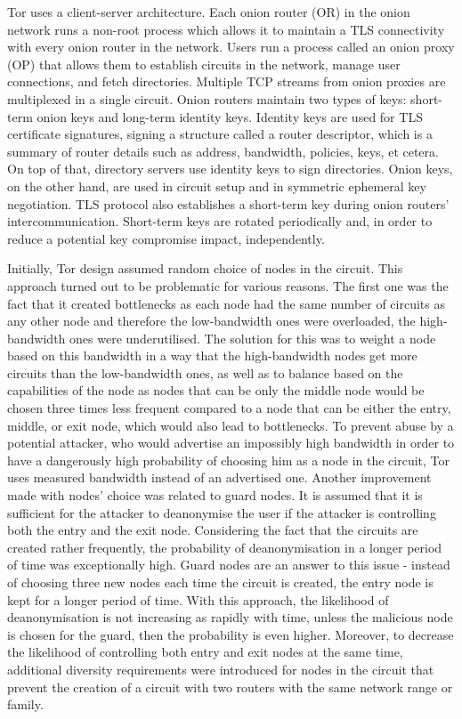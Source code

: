 Tor uses a client-server architecture. Each onion router (OR) in the onion network runs a non-root process which allows it to maintain a TLS connectivity with every onion router in the network. Users run a process called an onion proxy (OP) that allows them to establish circuits in the network, manage user connections, and fetch directories. Multiple TCP streams from onion proxies are multiplexed in a single circuit. Onion routers maintain two types of keys: short-term onion keys and long-term identity keys. Identity keys are used for TLS certificate signatures, signing a structure called a router descriptor, which is a summary of router details such as address, bandwidth, policies, keys, et cetera. On top of that, directory servers use identity keys to sign directories. Onion keys, on the other hand, are used in circuit setup and in symmetric ephemeral key negotiation. TLS protocol also establishes a short-term key during onion routers’ intercommunication. Short-term keys are rotated periodically and, in order to reduce a potential key compromise impact, independently. 

Initially, Tor design assumed random choice of nodes in the circuit. This approach turned out to be problematic for various reasons. The first one was the fact that it created bottlenecks as each node had the same number of circuits as any other node and therefore the low-bandwidth ones were overloaded, the high-bandwidth ones were underutilised. The solution for this was to weight a node based on this bandwidth in a way that the high-bandwidth nodes get more circuits than the low-bandwidth ones, as well as to balance based on the capabilities of the node as nodes that can be only the middle node would be chosen three times less frequent compared to a node that can be either the entry, middle, or exit node, which would also lead to bottlenecks. To prevent abuse by a potential attacker, who would advertise an impossibly high bandwidth in order to have a dangerously high probability of choosing him as a node in the circuit, Tor uses measured bandwidth instead of an advertised one. Another improvement made with nodes' choice was related to guard nodes. It is assumed that it is sufficient for the attacker to deanonymise the user if the attacker is controlling both the entry and the exit node. Considering the fact that the circuits are created rather frequently, the probability of deanonymisation in a longer period of time was exceptionally high. Guard nodes are an answer to this issue - instead of choosing three new nodes each time the circuit is created, the entry node is kept for a longer period of time. With this approach, the likelihood of deanonymisation is not increasing as rapidly with time, unless the malicious node is chosen for the guard, then the probability is even higher. Moreover, to decrease the likelihood of controlling both entry and exit nodes at the same time, additional diversity requirements were introduced for nodes in the circuit that prevent the creation of a circuit with two routers with the same network range or family.

